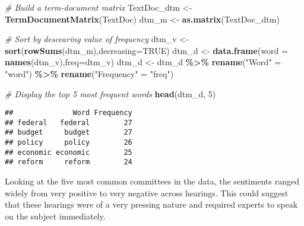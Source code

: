 \documentclass[]{article}
\newenvironment{Shaded}{\begin{snugshade}}{\end{snugshade}}
\newcommand{\CommentTok}[1]{\textcolor[rgb]{0.56,0.35,0.01}{\textit{#1}}}
\newcommand{\DataTypeTok}[1]{\textcolor[rgb]{0.13,0.29,0.53}{#1}}
\newcommand{\DecValTok}[1]{\textcolor[rgb]{0.00,0.00,0.81}{#1}}
\newcommand{\KeywordTok}[1]{\textcolor[rgb]{0.13,0.29,0.53}{\textbf{#1}}}
\newcommand{\NormalTok}[1]{#1}
\newcommand{\OperatorTok}[1]{\textcolor[rgb]{0.81,0.36,0.00}{\textbf{#1}}}
\newcommand{\OtherTok}[1]{\textcolor[rgb]{0.56,0.35,0.01}{#1}}
\newcommand{\StringTok}[1]{\textcolor[rgb]{0.31,0.60,0.02}{#1}}
\begin{document}
\begin{Shaded}
\begin{Highlighting}[]
\CommentTok{\# Build a term{-}document matrix}
\NormalTok{TextDoc\_dtm \textless{}{-}}\StringTok{ }\KeywordTok{TermDocumentMatrix}\NormalTok{(TextDoc)}
\NormalTok{dtm\_m \textless{}{-}}\StringTok{ }\KeywordTok{as.matrix}\NormalTok{(TextDoc\_dtm)}

\CommentTok{\# Sort by descearing value of frequency}
\NormalTok{dtm\_v \textless{}{-}}\StringTok{ }\KeywordTok{sort}\NormalTok{(}\KeywordTok{rowSums}\NormalTok{(dtm\_m),}\DataTypeTok{decreasing=}\OtherTok{TRUE}\NormalTok{)}
\NormalTok{dtm\_d \textless{}{-}}\StringTok{ }\KeywordTok{data.frame}\NormalTok{(}\DataTypeTok{word =} \KeywordTok{names}\NormalTok{(dtm\_v),}\DataTypeTok{freq=}\NormalTok{dtm\_v)}
\NormalTok{dtm\_d \textless{}{-}}\StringTok{ }\NormalTok{dtm\_d }\OperatorTok{\%\textgreater{}\%}
\StringTok{  }\KeywordTok{rename}\NormalTok{(}\StringTok{"Word"}\NormalTok{ =}\StringTok{ "word"}\NormalTok{) }\OperatorTok{\%\textgreater{}\%}
\StringTok{  }\KeywordTok{rename}\NormalTok{(}\StringTok{"Frequency"}\NormalTok{ =}\StringTok{ "freq"}\NormalTok{)}

\CommentTok{\# Display the top 5 most frequent words}
\KeywordTok{head}\NormalTok{(dtm\_d, }\DecValTok{5}\NormalTok{)}
\end{Highlighting}
\end{Shaded}

\begin{verbatim}
##              Word Frequency
## federal   federal        27
## budget     budget        27
## policy     policy        26
## economic economic        25
## reform     reform        24
\end{verbatim}

Looking at the five most common committees in the data, the sentiments
ranged widely from very positive to very negative across hearings. This
could suggest that these hearings were of a very pressing nature and
required experts to speak on the subject immediately.
\end{document}
